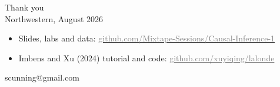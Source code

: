 \documentclass{beamer}
\newcommand{\deemph}[1]{\textcolor{warmgray}{\small #1}}
\newcommand{\myurlshort}[2]{\href{#1}{\textcolor{gray}{\textsf{#2}}}}
\begin{document}
\begin{frame}[plain]

\vspace{1.2em}
\begin{center}
{\Large Thank you}\\[0.6em]
\deemph{Northwestern, August 2026}
\end{center}

\vspace{1.4em}

\begin{itemize}
\item Slides, labs and data: \myurlshort{https://github.com/Mixtape-Sessions/Causal-Inference-1}{github.com/Mixtape-Sessions/Causal-Inference-1}
\item Imbens and Xu (2024) tutorial and code: \myurlshort{https://github.com/xuyiqing/lalonde}{github.com/xuyiqing/lalonde}
\end{itemize}

\vspace{0.8em}

\begin{center}
\deemph{scunning@gmail.com}
\end{center}

\end{frame}
\end{document}
